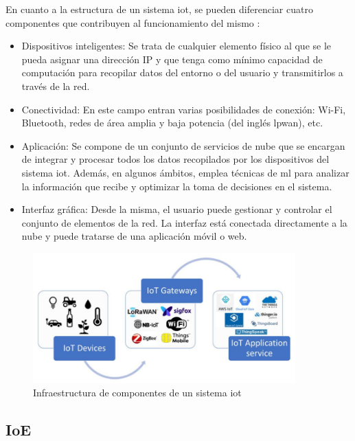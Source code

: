 En cuanto a la estructura de un sistema \gls{iot}, se pueden diferenciar cuatro componentes que contribuyen al funcionamiento del mismo \cite{iot} \cite{iotamazon}:

\begin{itemize}
    \item Dispositivos inteligentes: Se trata de cualquier elemento físico al que se le pueda asignar una dirección IP y que tenga como mínimo capacidad de computación para recopilar datos del entorno o del usuario y transmitirlos a través de la red. 
    \item Conectividad: En este campo entran varias posibilidades de conexión: Wi-Fi, Bluetooth, redes de área amplia y baja potencia (del inglés \gls{lpwan}), etc.
    \item Aplicación: Se compone de un conjunto de servicios de nube que se encargan de integrar y procesar todos los datos recopilados por los dispositivos del sistema \gls{iot}. Además, en algunos ámbitos, emplea técnicas de \gls{ml} para analizar la información que recibe y optimizar la toma de decisiones en el sistema.
    \item Interfaz gráfica: Desde la misma, el usuario puede gestionar y controlar el conjunto de elementos de la red. La interfaz está conectada directamente a la nube y puede tratarse de una aplicación móvil o web.
\end{itemize}

\begin{figure}[h!]
    \centering
    \includegraphics[width=0.9\textwidth]{img/teoria/iot.png}
    \caption{Infraestructura de componentes de un sistema \acrshort{iot} \cite{iotscheme}}
    \label{fig:iot}
\end{figure}

\subsection{IoE}
\label{sec:ioe}

